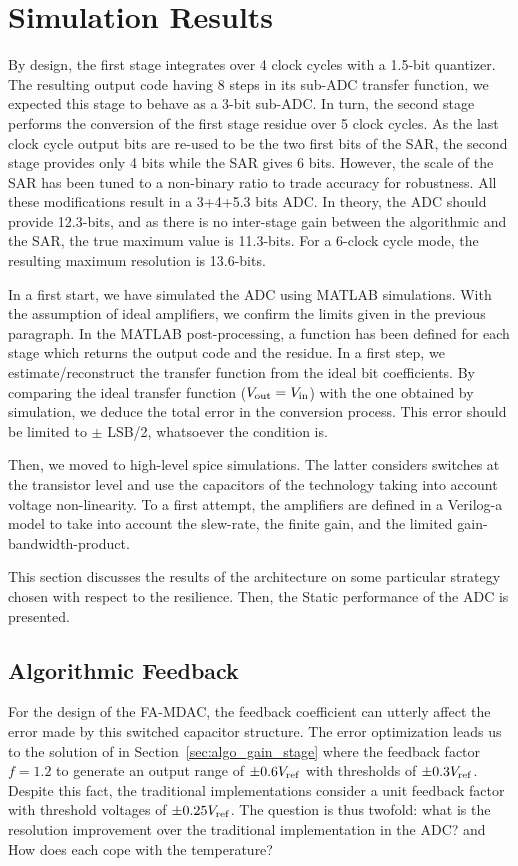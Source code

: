 \section{Simulation Results}             %
By design, the first stage integrates over 4 clock cycles with a 1.5-bit quantizer. The resulting output code having 8 steps in its sub-ADC transfer function, we expected this stage to behave as a 3-bit sub-ADC\@. In turn, the second stage performs the conversion of the first stage residue over 5 clock cycles. As the last clock cycle output bits are re-used to be the two first bits of the SAR, the second stage provides only 4 bits while the SAR gives 6 bits. However, the scale of the SAR has been tuned to a non-binary ratio to trade accuracy for robustness. All these modifications result in a 3+4+5.3 bits ADC\@. In theory, the ADC should provide 12.3-bits, and as there is no inter-stage gain between the algorithmic and the SAR, the true maximum value is 11.3-bits. For a 6-clock cycle mode, the resulting maximum resolution is 13.6-bits.

In a first start, we have simulated the ADC using MATLAB simulations. With the assumption of ideal amplifiers, we confirm the limits given in the previous paragraph. In the MATLAB post-processing, a function has been defined for each stage which returns the output code and the residue. In a first step, we estimate/reconstruct the transfer function from the ideal bit coefficients. By comparing the ideal transfer function ($V_{\rm out} = V_{\rm in}$) with the one obtained by simulation, we deduce the total error in the conversion process. This error should be limited to $\pm$ LSB/2, whatsoever the condition is.

Then, we moved to high-level spice simulations. The latter considers switches at the transistor level and use the capacitors of the technology taking into account voltage non-linearity. To a first attempt, the amplifiers are defined in a Verilog-a model to take into account the slew-rate, the finite gain, and the limited gain-bandwidth-product.

This section discusses the results of the architecture on some particular strategy chosen with respect to the resilience. Then, the Static performance of the ADC is presented.

\subsection{Algorithmic Feedback}
For the design of the FA-MDAC, the feedback coefficient can utterly affect the error made by this switched capacitor structure. The error optimization leads us to the solution of in Section~\ref{sec:algo_gain_stage} where the feedback factor \(f = 1.2\) to generate an output range of \(\pm 0.6 V_{\rm ref}\) with thresholds of \(\pm 0.3 V_{\rm ref}\). Despite this fact, the traditional implementations consider a unit feedback factor with threshold voltages of \(\pm 0.25 V_{\rm ref}\). The question is thus twofold: what is the resolution improvement over the traditional implementation in the ADC\@? and How does each cope with the temperature?

